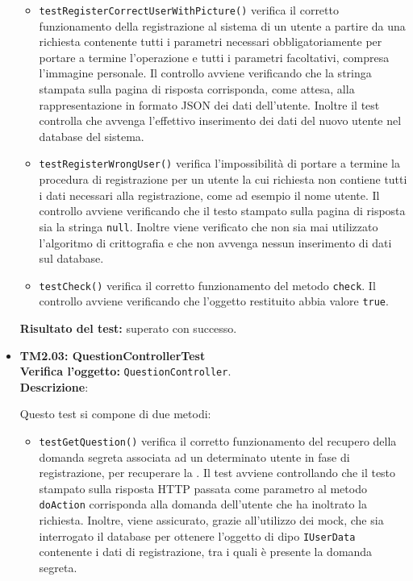 \begin{itemize}
\begin{itemize}
\item \texttt{testRegisterCorrectUserWithPicture()}
verifica il corretto funzionamento della registrazione al sistema di un utente a partire da una richiesta contenente tutti i parametri necessari obbligatoriamente per portare a termine l'operazione e tutti i parametri facoltativi, compresa l'immagine personale. 
Il controllo avviene verificando che la stringa stampata sulla pagina di risposta corrisponda, come attesa, alla rappresentazione in formato JSON dei dati dell'utente. Inoltre il test controlla che avvenga l'effettivo inserimento dei dati del nuovo utente nel database del sistema.

\item \texttt{testRegisterWrongUser()} 
verifica l'impossibilità di portare a termine la procedura di registrazione per un utente la cui richiesta non contiene tutti i dati necessari alla registrazione, come ad esempio il nome utente. Il controllo avviene verificando che il testo stampato sulla pagina di risposta sia la stringa \texttt{null}. Inoltre viene verificato che non sia mai utilizzato l'algoritmo di crittografia e che non avvenga nessun inserimento di dati sul database.
\item \texttt{testCheck()} verifica il corretto funzionamento del metodo \texttt{check}. Il controllo avviene verificando che l'oggetto restituito abbia valore \texttt{true}.
 
\end{itemize}

\textbf{Risultato del test:} superato con successo.




\item \textbf{TM2.03: QuestionControllerTest}\\
\textbf{Verifica l'oggetto:} \texttt{QuestionController}.\\
\textbf{Descrizione}: 

Questo test si compone di due metodi:
\begin{itemize}

\item \texttt{testGetQuestion()} verifica il corretto funzionamento del recupero della domanda segreta associata ad un determinato utente in fase di registrazione, per recuperare la .
Il test avviene controllando che il testo stampato sulla risposta HTTP passata come parametro al metodo \texttt{doAction} corrisponda alla domanda dell'utente che ha inoltrato la richiesta. Inoltre, viene assicurato, grazie all'utilizzo dei mock, che sia interrogato il database per ottenere l'oggetto di dipo \texttt{IUserData} contenente i dati di registrazione, tra i quali è presente la domanda segreta. 


\end{itemize}
\end{itemize}
